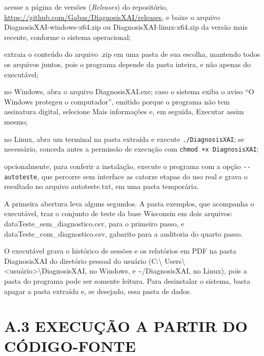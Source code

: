 \documentclass[
    12pt
    ,oneside
    ,a4paper
    ,chapter=TITLE
    ,section=TITLE
    ,sumario=abnt-6027-2012
    ,english,brazil]{abntex2} %
\begin{document}
\begin{alineas}
    \item acesse a página de versões (\textit{Releases}) do repositório,
          \url{https://github.com/Gabas/DiagnosisXAI/releases}, e baixe o
          arquivo DiagnosisXAI-windows-x64.zip ou DiagnosisXAI-linux-x64.zip
          da versão mais recente, conforme o sistema operacional;
    \item extraia o conteúdo do arquivo .zip em uma pasta de sua escolha,
          mantendo todos os arquivos juntos, pois o programa depende da pasta
          inteira, e não apenas do executável;
    \item no Windows, abra o arquivo DiagnosisXAI.exe; caso o sistema exiba o
          aviso ``O Windows protegeu o computador'', emitido porque o programa
          não tem assinatura digital, selecione Mais informações e, em seguida,
          Executar assim mesmo;
    \item no Linux, abra um terminal na pasta extraída e execute
          \texttt{./DiagnosisXAI}; se necessário, conceda antes a permissão de
          execução com \texttt{chmod +x DiagnosisXAI};
    \item opcionalmente, para conferir a instalação, execute o programa com a
          opção \texttt{-}\texttt{-autoteste}, que percorre sem interface as
          catorze etapas do uso real e grava o resultado no arquivo
          autoteste.txt, em uma pasta temporária.
\end{alineas}

A primeira abertura leva alguns segundos. A pasta exemplos, que acompanha o
executável, traz o conjunto de teste da base Wisconsin em dois arquivos:
dataTeste\_sem\_diagnostico.csv, para o primeiro passo, e
dataTeste\_com\_diagnostico.csv, gabarito para a auditoria do quarto passo.

O executável grava o histórico de sessões e os relatórios em PDF na pasta
DiagnosisXAI do diretório pessoal do usuário (C:\textbackslash
Users\textbackslash \textless usuário\textgreater \textbackslash DiagnosisXAI,
no Windows, e \textasciitilde/DiagnosisXAI, no Linux), pois a pasta do programa
pode ser somente leitura. Para desinstalar o sistema, basta apagar a pasta
extraída e, se desejado, essa pasta de dados.

\section*{A.3 EXECUÇÃO A PARTIR DO CÓDIGO-FONTE}
\end{document}
